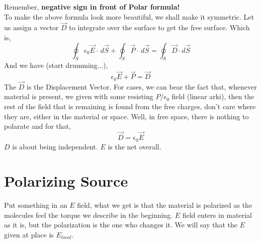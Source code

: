 \documentclass[12pt,a4paper]{memoir}
\begin{document}
Remember, \textbf{negative sign in front of Polar formula!} \\
To make the above formula look more beautiful, we shall make it symmetric. Let us assign a vector $\vec{D}$ to integrate over the surface to get the free surface. Which is,
\begin{equation}
  \oint_{S} \epsilon_0 \vec{E} \cdot \, d\vec{S} +\oint_{S} \vec{P} \cdot \, d\vec{S} = \oint_{S} \vec{D} \cdot d\vec{S} 
\end{equation}
And we have (start drumming...),
\begin{equation}
\epsilon_0 \vec{E} + \vec{P} = \vec{D}
\end{equation}
The $\vec{D}$ is the Displacement Vector. For cases, we can bear the fact that, whenever material is present, we given with some resisting $P/ \epsilon_0$ field (linear arki), then the rest of the field that is remaining is found from the free charges, don't care where they are, either in the material or space. Well, in free space, there is nothing to polarate and for that,
\begin{equation}
\vec{D} = \epsilon_0 \vec{E}
\end{equation}
$D$ is about being independent. $E$ is the net overall.
\section{Polarizing Source}
Put something in an $E$ field, what we get is that the material is polarized as the molecules feel the torque we describe in the beginning. $E$ field enters in material as it is, but the polarization is the one who changes it. We will say that the $E$ given at place is $E_{local}$.
\end{document}
